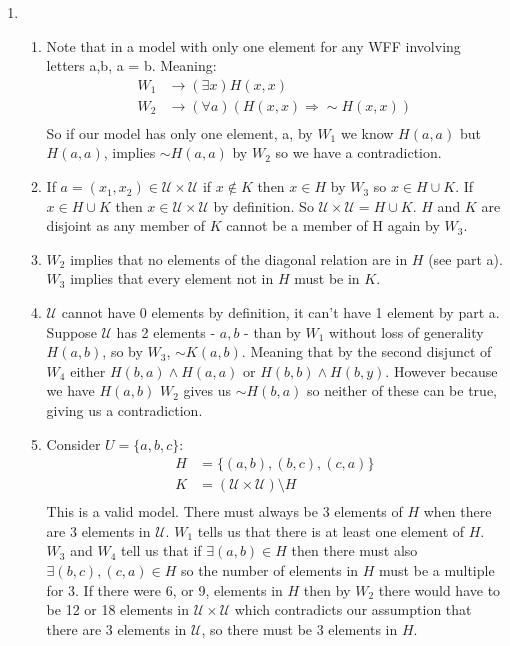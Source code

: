 \documentclass[11pt] {article}
\begin{document}
\begin{enumerate}
	\item 
	\begin{enumerate}
		\item Note that in a model with only one element for any WFF involving letters a,b, a = b. Meaning:
			\begin{align*}
				W_1 & \rightarrow (\exists x)H(x,x) \\
				W_2 & \rightarrow  (\forall a)(H(x,x) \Rightarrow \sim H(x,x)) \\
			\end{align*}
		So if our model has only one element, a, by $W_1$ we know $H(a,a)$ but $H(a,a)$, implies $\sim H(a,a)$ by $W_2$ so we have a contradiction.
	\item If $a = (x_1, x_2) \in \mathcal{U} \times \mathcal{U}$ if $x \notin K$ then $x \in H$ by $W_3$ so $x \in H \cup K$. If $x \in H\cup K$ then $x \in \mathcal{U} \times \mathcal{U}$ by definition. So $\mathcal{U} \times \mathcal{U} = H\cup K$. $H$ and $K$ are disjoint as any member of $K$ cannot be a member of H again by $W_3$. 
	\item $W_2$ implies that no elements of the diagonal relation are in $H$ (see part a).$W_3$ implies that every element not in $H$ must be in $K$.
	\item $\mathcal{U}$ cannot have 0 elements by definition, it can't have 1 element by part a. Suppose $\mathcal{U}$ has 2 elements - $a,b$ - than by $W_1$ without loss of generality $H(a,b)$, so by $W_3$, $\sim K(a,b)$. Meaning that by the second disjunct of $W_4$ either $H(b,a) \land H(a,a)$ or $H(b,b) \land H(b,y)$. However because we have $H(a,b)$ $W_2$ gives us $\sim H(b,a)$  so neither of these can be true, giving us a contradiction.
	\item Consider $ U = \{a,b,c\} $:
		\begin{align*}
			H &= \{(a,b),(b,c),(c,a)\} \\
			K &= (\mathcal{U}\times \mathcal{U}) \setminus H\\
		\end{align*}
			This is a valid model. There must always be $3$ elements of $H$ when there are $3$ elements in $\mathcal{U}$. $W_1$ tells us that there is at least one element of $H$. $W_3$ and $W_4$ tell us that if $\exists (a,b) \in H$ then there must also $\exists (b,c),(c,a) \in H$ so the number of elements in $H$ must be a multiple for 3. If there were 6, or 9, elements in $H$ then by $W_2$ there would have to be 12 or 18 elements in $\mathcal{U} \times \mathcal{U}$ which contradicts our assumption that there are 3 elements in $\mathcal{U}$, so there must be 3 elements in $H$.

\end{enumerate}
\end{enumerate}
\end{document}

